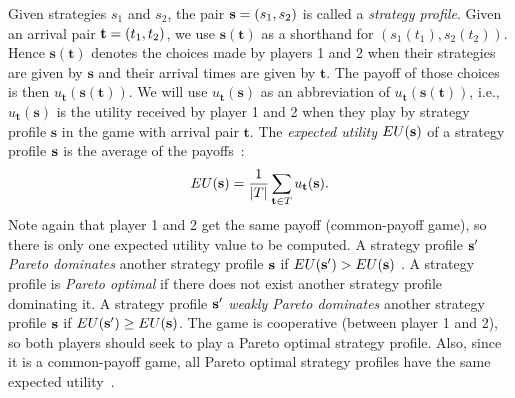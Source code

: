 \documentclass[twocolumn,a4paper,superscriptaddress,nofootinbib]{revtex4}
\begin{document}
Given strategies $s_1$ and $s_2$, the pair ${\bf s} = (s_1,s_2)$ is called a \emph{strategy profile}. Given an arrival pair ${\bf t} = (t_1,t_2)$, we use $\mathbf{s}(\mathbf{t})$ as a shorthand for $(s_1(t_1), s_2(t_2))$. Hence $\mathbf{s}(\mathbf{t})$ denotes the choices made by players 1 and 2 when their strategies are given by $\mathbf{s}$ and their arrival times are given by $\mathbf{t}$.
The payoff of those choices is then $u_\mathbf{t}(\mathbf{s}(\mathbf{t}))$. We will use $u_\mathbf{t}(\mathbf{s})$ as an abbreviation of $u_\mathbf{t}(\mathbf{s}(\mathbf{t}))$, i.e., $u_\mathbf{t}(\mathbf{s})$ is the utility received by player 1 and 2 when they play by strategy profile $\mathbf{s}$ in the game with arrival pair $\mathbf{t}$. The \emph{expected utility} $EU(\bf{s})$ of a strategy profile $\bf s$ is the average of the payoffs~\citep{shoham2008multiagent}:
\[
 EU({\bf s}) = \frac{1}{| T |} \sum_{{\bf t} \in T} u_\mathbf{t}(\mathbf{s}). %
\]
Note again that player 1 and 2 get the same payoff (common-payoff game), so there is only one expected utility value to be computed. A strategy profile ${\bf s}'$ \emph{Pareto dominates} another strategy profile $\bf s$ if $EU({\bf s}') > EU({\bf s})$ \citep{shoham2008multiagent}.
A strategy profile is \emph{Pareto optimal} if there does not exist another strategy profile dominating it. A strategy profile ${\bf s}'$ \emph{weakly Pareto dominates} another strategy profile $\bf s$ if $EU({\bf s}') \geq EU({\bf s})$. The game is cooperative (between player 1 and 2), so both players should seek to play a Pareto optimal strategy profile. Also, since it is a common-payoff game, all Pareto optimal strategy profiles have the same expected utility~\citep{shoham2008multiagent}. 
\end{document}
